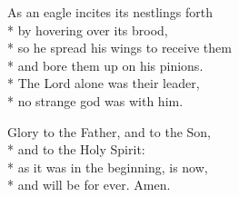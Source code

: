 As an eagle incites its nestlings forth \\*
by hovering over its brood,\\*
so he spread his wings to receive them \\*
and bore them up on his pinions.\\*
The Lord alone was their leader, \\*
no strange god was with him.

Glory to the Father, and to the Son,\\*
and to the Holy Spirit:\\*
as it was in the beginning, is now,\\*
and will be for ever. Amen.